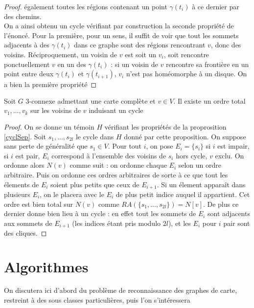 \documentclass{scrartcl}
\begin{document}
\begin{flushleft}
\begin{proof}
    également toutes les régions contenant un point $\gamma(t_i)$ à ce dernier par des chemins.\\
    On a ainsi obtenu un cycle vérifiant par construction la seconde propriété de l'énoncé. Pour la première, pour un sens,
    il suffit de voir que tout les sommets adjacents à des $\gamma(t_i)$ dans ce graphe sont des régions rencontrant $v$, donc des
    voisins. Réciproquement, un voisin de $v$ est soit un $v_i$, soit rencontre ponctuellement $v$ en un des $\gamma(t_i)$ : si un
    voisin de $v$ rencontre sa frontière en un point entre deux $\gamma(t_i)$ et $\gamma(t_{i+1})$, $v_i$ n'est pas homéomorphe à
    un disque. On a bien la première propriété
\end{proof}

\begin{cor}\label{ordCycl}
    Soit $G$ $3$-connexe admettant une carte complète et $v \in V$. Il existe un ordre total $v_1, ..., v_k$ sur les voisins de $v$
    induisant un cycle
\end{cor}

\begin{proof}
    On se donne un témoin $H$ vérifiant les propriétés de la proprosition \ref{cyclSep}. Soit $s_1, ..., s_{2l}$ le cycle dans $H$
    donné par cette proposition. On suppose sans perte de généralité que $s_1 \in V$. Pour tout $i$, on pose $E_i = \{s_i\}$
    si $i$ est impair, si $i$ est pair, $E_i$ correspond à l'ensemble des voisins de $s_i$ hors cycle, $v$ exclu. On ordonne alors $N(v)$
    comme suit : on ordonne chaque $E_i$ selon un ordre arbitraire. Puis on ordonne ces ordres arbitraires de sorte à ce que
    tout les élements de $E_i$ soient plus petits que ceux de $E_{i+1}$. Si un élement apparaît dans plusieurs $E_i$, on le placera avec
    le $E_i$ de plus petit indice auquel il appartient. Cet ordre est bien total sur $N(v)$
    comme $RA(\{s_1, ..., s_{2l}\}) = N[v]$. De plus ce dernier donne bien lieu à un cycle : en effet tout les sommets de $E_i$ sont
    adjacents aux sommets de $E_{i+1}$ (les indices étant pris modulo $2l$), et les $E_i$ pour $i$ pair sont des cliques.
\end{proof}

\section{Algorithmes}

On discutera ici d'abord du problème de reconnaissance des graphes de carte, restreint à des sous classes particulières, puis l'on s'intéressera


\end{flushleft}
\end{document}
